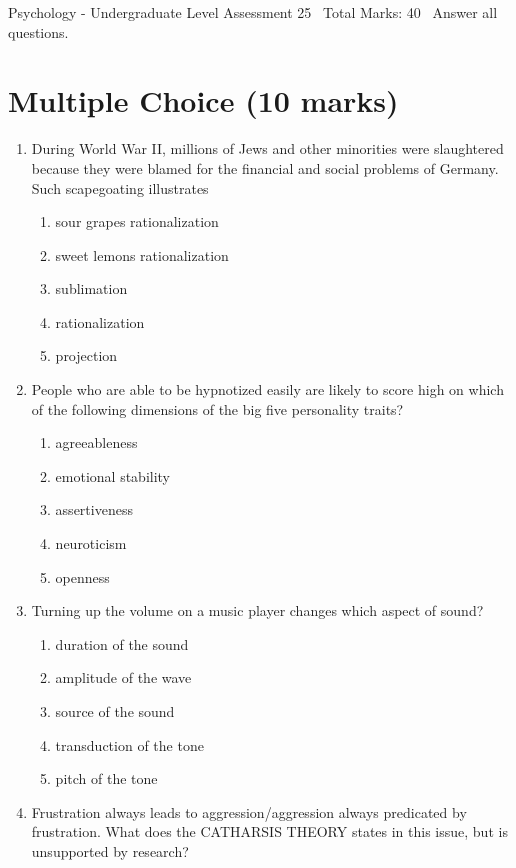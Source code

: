 \documentclass[12pt]{article}
\begin{document}
\begin{center}
Psychology - Undergraduate Level Assessment 25 \
Total Marks: 40 \
Answer all questions.
\end{center}

\section*{Multiple Choice (10 marks)}
\begin{enumerate}[label=\arabic*.]
\item During World War II, millions of Jews and other minorities were slaughtered because they were blamed for the financial and social problems of Germany. Such scapegoating illustrates
\begin{enumerate}[label=(\alph*)]
    \item sour grapes rationalization
    \item sweet lemons rationalization
    \item sublimation
    \item rationalization
    \item projection
\end{enumerate}
\item People who are able to be hypnotized easily are likely to score high on which of the following dimensions of the big five personality traits?
\begin{enumerate}[label=(\alph*)]
    \item agreeableness
    \item emotional stability
    \item assertiveness
    \item neuroticism
    \item openness
\end{enumerate}
\item Turning up the volume on a music player changes which aspect of sound?
\begin{enumerate}[label=(\alph*)]
    \item duration of the sound
    \item amplitude of the wave
    \item source of the sound
    \item transduction of the tone
    \item pitch of the tone
\end{enumerate}
\item Frustration always leads to aggression/aggression always predicated by frustration. What does the CATHARSIS THEORY states in this issue, but is unsupported by research?

\end{enumerate}
\end{document}

